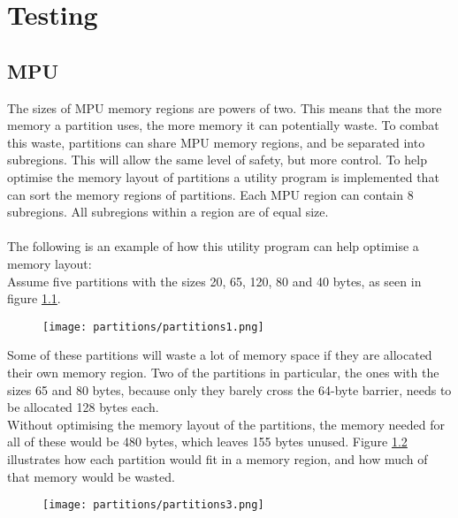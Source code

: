 \chapter{Testing}

\section{MPU}
The sizes of MPU memory regions are powers of two. This means that the more
memory a partition uses, the more memory it can potentially waste. To combat
this waste, partitions can share MPU memory regions, and be separated
into subregions. This will allow the same level of safety, but more control.
To help optimise the memory layout of partitions a utility program is implemented
that can sort the memory regions of partitions. Each MPU region can contain 8
subregions. All subregions within a region are of equal size.
\\\\
The following is an example of how this utility program can help optimise a
memory layout:
\\


Assume five partitions with the sizes 20, 65, 120, 80 and 40 bytes, as seen in figure \ref{fig:ce2}.\\

\begin{figure}[H]
\centering
\texttt{[image: partitions/partitions1.png]}
\label{fig:ce2}
\end{figure}

Some of these partitions will waste a lot of memory space if they are allocated their
own memory region. Two of the partitions in particular, the ones with the sizes
65 and 80 bytes, because only they barely cross the 64-byte barrier, needs to be
allocated 128 bytes each.\\
Without optimising the memory layout of the partitions, the memory needed for
all of these would be 480 bytes, which leaves 155 bytes unused. Figure
\ref{fig:ce3} illustrates how each partition would fit in a memory region, and how
much of that memory would be wasted.

\begin{figure}[H]
\centering
\texttt{[image: partitions/partitions3.png]}
\label{fig:ce3}
\end{figure}

